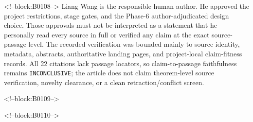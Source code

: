 \documentclass[11pt]{article}
\begin{document}
<!--block:B0108-->
Liang Wang is the responsible human author. He approved the project
restrictions, stage gates, and the Phase-6 author-adjudicated design
choice. Those approvals must not be interpreted as a statement that he
personally read every source in full or verified any claim at the exact
source-passage level. The recorded verification was bounded mainly to
source identity, metadata, abstracts, authoritative landing pages, and
project-local claim-fitness records. All 22 citations lack passage
locators, so claim-to-passage faithfulness remains
\texttt{INCONCLUSIVE}; the article does not claim theorem-level source
verification, novelty clearance, or a clean retraction/conflict screen.

<!--block:B0109-->



<!--block:B0110-->
\end{document}

